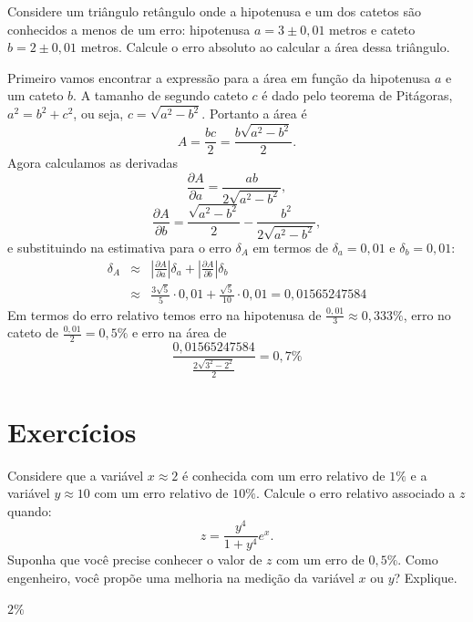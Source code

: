 \documentclass[main.tex]{subfiles}
\begin{document}
\begin{ex}
Considere um triângulo retângulo onde a hipotenusa e um dos catetos são conhecidos a menos de um erro: hipotenusa $a=3\pm 0,01$ metros e cateto $b=2\pm 0,01$ metros. Calcule o erro absoluto ao calcular a área dessa triângulo.
\end{ex}
\begin{sol}
Primeiro vamos encontrar a expressão para a área em função da hipotenusa $a$ e um cateto $b$. A tamanho de segundo cateto $c$ é dado pelo teorema de Pitágoras, $a^2=b^2+c^2$, ou seja, $c=\sqrt{a^2-b^2}$. Portanto a área é $$
A=\frac{bc}{2}=\frac{b\sqrt{a^2-b^2}}{2}.
$$
Agora calculamos as derivadas
$$
\frac{\partial A}{\partial a}=\frac{ab}{2\sqrt{a^2-b^2}},
$$
$$
\frac{\partial A}{\partial b}=\frac{\sqrt{a^2-b^2}}{2}-\frac{b^2}{2\sqrt{a^2-b^2}},
$$
e substituindo na estimativa para o erro $\delta_A$ em termos de $\delta_a=0,01$ e $\delta_b=0,01$:
\begin{eqnarray*}
\delta_A&\approx & \left|\frac{\partial A}{\partial a}\right|\delta_a+\left|\frac{\partial A}{\partial b}\right|\delta_b\\
&\approx &\frac{3\sqrt{5}}{5}\cdot 0,01+\frac{\sqrt{5}}{10}\cdot 0,01=0,01565247584
\end{eqnarray*}
Em termos do erro relativo temos erro na hipotenusa de $\frac{0,01}{3}\approx 0,333\%$, erro no cateto de $\frac{0,01}{2}= 0,5\%$ e erro na área de
$$
\frac{0,01565247584}{\frac{2\sqrt{3^2-2^2}}{2}}=0,7\%
$$
\end{sol}

\section*{Exercícios}

\begin{Exercise}Considere que a variável $x\approx 2$ é conhecida com um erro relativo de $1\%$ e a variável $y\approx 10$ com um erro relativo de $10\%$. Calcule o erro relativo associado a $z$ quando:
  \begin{equation*}
    z=\frac{y^4}{1+y^4}e^x.  
  \end{equation*}
Suponha que você precise conhecer o valor de $z$ com um erro de $0,5\%$. Como engenheiro, você propõe uma melhoria na medição da variável $x$ ou $y$? Explique.
\end{Exercise}
\begin{Answer}
  \begin{tiny}
    $2\%$    
  \end{tiny}
\end{Answer}
\end{document}
